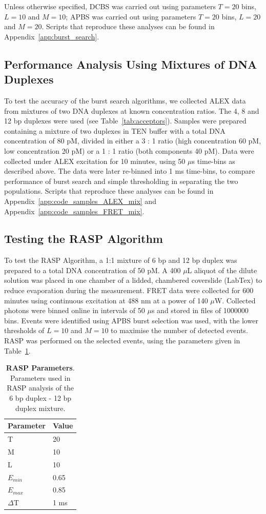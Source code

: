 Unless otherwise specified, DCBS was carried out using parameters $T = 20$ bins, $L = 10$ and $M = 10$; APBS was carried out using parameters $T = 20$ bins, $L = 20$ and $M = 20$. Scripts that reproduce these analyses can be found in Appendix~\ref{app:burst_search}.

\subsection{Performance Analysis Using Mixtures of DNA Duplexes}
To test the accuracy of the burst search algorithms, we collected ALEX data from mixtures of two DNA duplexes at known concentration ratios. The 4, 8 and 12 bp duplexes were used (see Table~\ref{tab:acceptors}). Samples were prepared containing a mixture of two duplexes in TEN buffer with a total DNA concentration of 80 pM, divided in either a 3 : 1 ratio (high concentration 60 pM, low concentration 20 pM) or a 1 : 1 ratio (both components 40 pM). Data were collected under ALEX excitation for 10 minutes, using 50 $\mu$s time-bins as described above. The data were later re-binned into 1 ms time-bins, to compare performance of burst search and simple thresholding in separating the two populations. Scripts that reproduce these analyses can be found in Appendix~\ref{app:code_samples_ALEX_mix} and Appendix~\ref{app:code_samples_FRET_mix}.  


\subsection{Testing the RASP Algorithm}
To test the RASP Algorithm, a 1:1 mixture of 6 bp and 12 bp duplex was prepared to a total DNA concentration of 50 pM. A 400 $\mu$L aliquot of the dilute solution was placed in one chamber of a lidded, chambered coverslide (LabTex) to reduce evaporation during the measurement. FRET data were collected for 600 minutes using continuous excitation at 488 nm at a power of 140 $\mu$W. Collected photons were binned online in intervals of 50 $\mu$s and stored in files of 1000000 bins. Events were identified using APBS burst selection was used, with the lower thresholds of $L = 10$ and $M = 10$ to maximise the number of detected events. RASP was performed on the selected events, using the parameters given in Table~\ref{tab:RASP}. 

\begin{table}[!ht]
\caption{
{\bf{RASP Parameters}}. Parameters used in RASP analysis of the 6 bp duplex - 12 bp duplex mixture.}
\begin{tabular}{|l|l|}
\hline
Parameter & Value \\
\hline
T & 20 \\
M & 10 \\
L & 10 \\
$E_{min}$ & 0.65 \\
$E_{max}$ & 0.85 \\
$\Delta$T & 1 ms \\
\hline
\end{tabular}

\label{tab:RASP}
\end{table}

